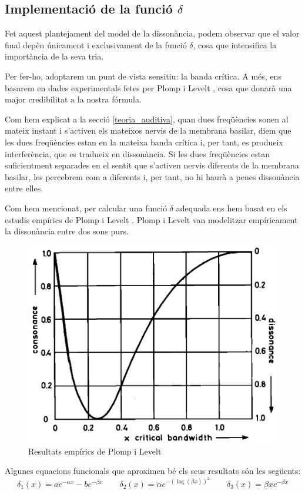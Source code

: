 \documentclass{article}
\theoremstyle{math}
\theoremstyle{TheoremNum}
\newcommand{\0}{\ensuremath{\vb{0}}}
\begin{document}
\subsection{Implementació de la funció \texorpdfstring{$\delta$}{delta}} 
Fet aquest plantejament del model de la dissonància, podem observar que el valor final depèn únicament i exclusivament de la funció $\delta$, cosa que intensifica la importància de la seva tria.\par
Per fer-ho, adoptarem un punt de vista sensitiu: la banda crítica. A més, ens basarem en dades experimentals fetes per Plomp i Levelt \cite{plomp}, cosa que donarà una major credibilitat a la nostra fórmula.\par Com hem explicat a la secció \ref{teoria_auditiva}, quan dues freqüències sonen al mateix instant i s'activen els mateixos nervis de la membrana basilar, diem que les dues freqüències estan en la mateixa banda crítica i, per tant, es produeix interferència, que es tradueix en dissonància. Si les dues freqüències estan suficientment separades en el sentit que s'activen nervis diferents de la membrana basilar, les percebrem com a diferents i, per tant, no hi haurà a penes dissonància entre elles.\par 
Com hem mencionat, per calcular una funció $\delta$ adequada ens hem basat en els estudis empírics de Plomp i Levelt \cite{plomp}. Plomp i Levelt van modelitzar empíricament la dissonància entre dos sons purs.
\begin{figure}[ht]
    \centering
    \includegraphics[width=0.4\linewidth, angle=-0.1]{Imatges_main/plompt-levelt.png}
    \caption{Resultats empírics de Plomp i Levelt \cite{plomp}}
    \label{fig_plomp}
\end{figure}\par
\noindent Algunes equacions funcionals que aproximen bé els seus resultats són les següents: $$\delta_1(x)=ae^{-\alpha x}-be^{-\beta x}\qquad\delta_2(x)=\alpha e^{-\left(\log(\beta x)\right)^2}\qquad\delta_3(x)=\beta xe^{-\beta x}$$
\end{document}
